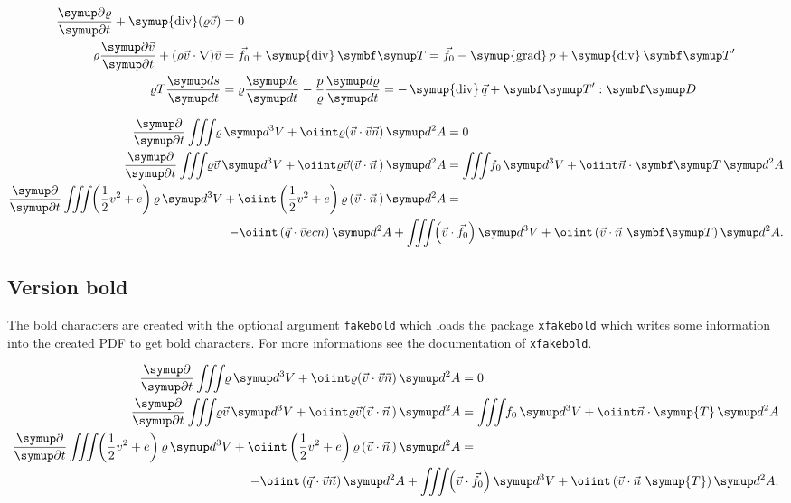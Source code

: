 \documentclass[english,log-declarations=false]{article}
\DeclareMathOperator{\Div}{\symup{div}}
\DeclareMathOperator{\Grad}{\symup{grad}}
\begin{document}
\begin{align}
\begin{aligned}
  \Q{\varrho}{t}+\Div(\varrho\vec{v}) &= 0 \\
  \varrho\Q{\vec{v}}{t}+(\varrho\vec{v}\cdot\nabla)\vec{v}   &= \vec{f}_0+\Div\TT=\vec{f}_0
	-\Grad p+\Div\TT' \\
  \varrho T\frac{\diff s}{\diff t}               &= \varrho\frac{\diff e}{\diff t}
    -\frac{p}{\varrho}\frac{\diff\varrho}{\diff t}=-\Div\vec{q}+\TT':\DD 
\end{aligned}
\end{align}

\begin{align}
 \Q{}{t}\iiint\<\varrho\diff^3V+\oiint\varrho(\vec{v}\cdot\vec{v}\vec{n})\diff^2A          &= 0\\
 \Q{}{t}\iiint\<\varrho\vec{v}\diff^3V+\oiint\varrho\vec{v}(\vec{v}\cdot\vec{n}\,)\diff^2A &=
        \iiint\<f_0\diff^3V+\oiint\vec{n}\cdot\TT\diff^2A \\
 \Q{}{t}\iiint\<\left(\half v^2+e\right)\varrho\diff^3V+\oiint\left(\half v^2+e\right)
        \varrho\left(\vec{v}\cdot\vec{n}\,\right)\diff^2A                                & =\\
 \multispan2{\hfill${\displaystyle-\oiint\left(\vec{q}\cdot\vec{v}ec{n}\right)\diff^2A+
         \iiint\<\left(\vec{v}\cdot\vec{f}_0\right)\diff^3V+\oiint\left(\vec{v}
         \cdot\vec{n}~\TT\right)\diff^2A}$}.\nonumber
\end{align}


\subsection{Version bold}

The bold characters are created with the %
optional argument \texttt{fakebold} which loads the
package \texttt{xfakebold} which writes some information into the created PDF to get bold
characters. For more informations see the documentation of \texttt{xfakebold}.

\setBold
\begin{align}
 \Q{}{t}\iiint\<\varrho\diff^3V+\oiint\varrho(\vec{v}\cdot\vec{v}\vec{n})\diff^2A          &= 0\\
 \Q{}{t}\iiint\<\varrho\vec{v}\diff^3V+\oiint\varrho\vec{v}(\vec{v}\cdot\vec{n}\,)\diff^2A &=
        \iiint\<f_0\diff^3V+\oiint\vec{n}\cdot\symup{T}\diff^2A \\
 \Q{}{t}\iiint\<\left(\half v^2+e\right)\varrho\diff^3V+\oiint\left(\half v^2+e\right)
        \varrho\left(\vec{v}\cdot\vec{n}\,\right)\diff^2A                                & =\\
 \multispan2{\hfill${\displaystyle-\oiint\left(\vec{q}\cdot\vec{v}\vec{n}\right)\diff^2A+
         \iiint\<\left(\vec{v}\cdot\vec{f}_0\right)\diff^3V+\oiint\left(\vec{v}
         \cdot\vec{n}~\symup{T}\right)\diff^2A}$}.\nonumber
\end{align}
\end{document}
